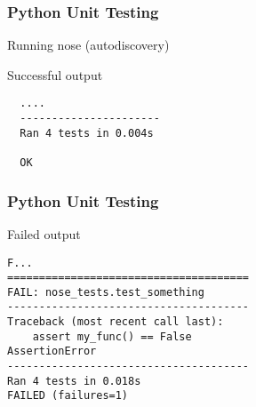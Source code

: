 \begin{frame}[fragile]
  \frametitle{Python Unit Testing}
  \begin{block}{Running nose (autodiscovery)}
    \vspace{0.1cm}
    \hspace{0.2cm}{\ttfamily nosetests}
    \vspace{0.2cm}
  \end{block}
  \begin{block}{Successful output}
    \begin{verbatim}
  ....
  ----------------------
  Ran 4 tests in 0.004s

  OK
    \end{verbatim}
  \end{block}
\end{frame}

\begin{frame}[fragile]
  \frametitle{Python Unit Testing}
  \begin{block}{Failed output}
    \begin{verbatim}
F...
======================================
FAIL: nose_tests.test_something
--------------------------------------
Traceback (most recent call last):
    assert my_func() == False
AssertionError
--------------------------------------
Ran 4 tests in 0.018s
FAILED (failures=1)
    \end{verbatim}
  \end{block}
\end{frame}

